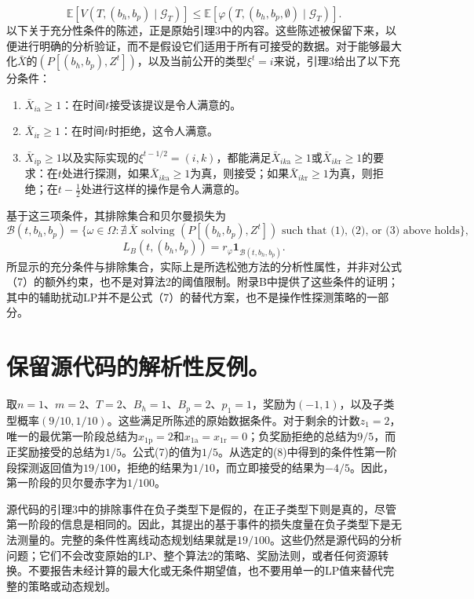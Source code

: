 \documentclass{article}
\begin{document}
\[
\mathbb E[V(T,(b_h,b_p)\mid\mathcal G_T)]
\le\mathbb E[\varphi(T,(b_h,b_p,\emptyset)\mid\mathcal G_T)].
\]
以下关于充分性条件的陈述，正是原始引理3中的内容。这些陈述被保留下来，以便进行明确的分析验证，而不是假设它们适用于所有可接受的数据。对于能够最大化$\bar X$的$(P[(b_h,b_p),Z^t])$，以及当前公开的类型$\xi^t=i$来说，引理3给出了以下充分条件：
\begin{enumerate}
\item $\bar X_{i\mathrm a}\ge1$：在时间$t$接受该提议是令人满意的。
\item $\bar X_{i\mathrm r}\ge1$：在时间$t$时拒绝，这令人满意。
\item $\bar X_{i\mathrm p}\ge1$以及实际实现的$\xi^{t-1/2}=(i,k)$，都能满足$\bar X_{ik\mathrm a}\ge1$或$\bar X_{ik\mathrm r}\ge1$的要求：在$t$处进行探测，如果$\bar X_{ik\mathrm a}\ge1$为真，则接受；如果$\bar X_{ik\mathrm r}\ge1$为真，则拒绝；在$t-\tfrac12$处进行这样的操作是令人满意的。
\end{enumerate}
基于这三项条件，其排除集合和贝尔曼损失为
\[
\mathcal B(t,b_h,b_p)=
\{\omega\in\Omega:\nexists\,\bar X\text{ solving }(P[(b_h,b_p),Z^t])
\text{ such that (1), (2), or (3) above holds}\},
\]
\[
L_B(t,(b_h,b_p))=r_\varphi\mathbf1_{\mathcal B(t,b_h,b_p)}.
\]
所显示的充分条件与排除集合，实际上是所选松弛方法的分析性属性，并非对公式（7）的额外约束，也不是对算法2的阈值限制。附录B中提供了这些条件的证明；其中的辅助扰动LP并不是公式（7）的替代方案，也不是操作性探测策略的一部分。

\section*{保留源代码的解析性反例。}
取$n=1$、$m=2$、$T=2$、$B_h=1$、$B_p=2$、$p_1=1$，奖励为$(-1,1)$，以及子类型概率$(9/10,1/10)$。这些满足所陈述的原始数据条件。对于剩余的计数$z_1=2$，唯一的最优第一阶段总结为$x_{1\mathrm p}=2$和$x_{1\mathrm a}=x_{1\mathrm r}=0$；负奖励拒绝的总结为$9/5$，而正奖励接受的总结为$1/5$。公式(7)的值为$1/5$。从选定的(8)中得到的条件性第一阶段探测返回值为$19/100$，拒绝的结果为$1/10$，而立即接受的结果为$-4/5$。因此，第一阶段的贝尔曼赤字为$1/100$。

源代码的引理3中的排除事件在负子类型下是假的，在正子类型下则是真的，尽管第一阶段的信息是相同的。因此，其提出的基于事件的损失度量在负子类型下是无法测量的。完整的条件性离线动态规划结果就是$19/100$。这些仍然是源代码的分析问题；它们不会改变原始的LP、整个算法2的策略、奖励法则，或者任何资源转换。不要报告未经计算的最大化或无条件期望值，也不要用单一的LP值来替代完整的策略或动态规划。
\end{document}
